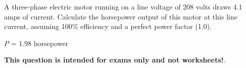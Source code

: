 

A three-phase electric motor running on a line voltage of 208 volts draws 4.1 amps of current.  Calculate the horsepower output of this motor at this line current, assuming 100\% efficiency and a perfect power factor (1.0).







$P$ = 1.98 horsepower







{\bf This question is intended for exams only and not worksheets!}.



